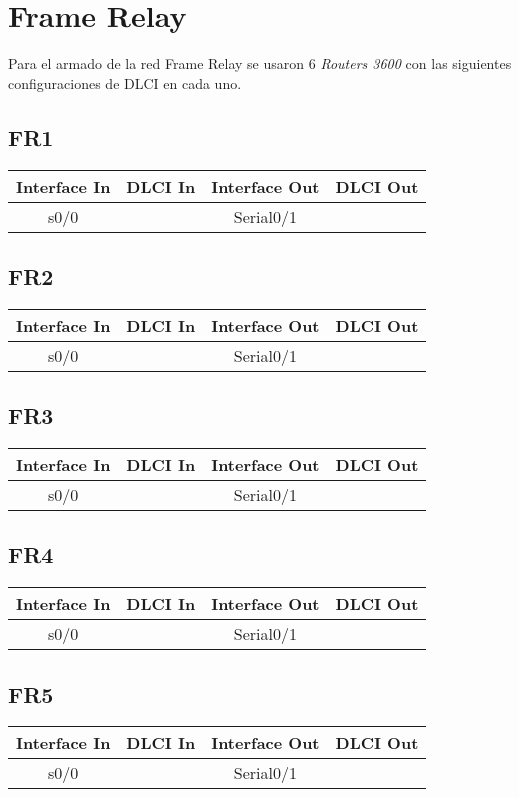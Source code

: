 \documentclass[12pt,a4paper,spanish]{article}
\begin{document}
\newpage
\section{Frame Relay}
Para el armado de la red Frame Relay se usaron 6 \emph{Routers 3600}
con las siguientes configuraciones de DLCI en cada uno.
\subsection{FR1}
\begin{tabular}{|c|c|c|c|}
\hline
Interface In & DLCI In & Interface Out & DLCI Out \\
\hline
\hline
 s0/0 &  & Serial0/1 &  \\
\hline
\end{tabular}

\subsection{FR2}
\begin{tabular}{|c|c|c|c|}
\hline
Interface In & DLCI In & Interface Out & DLCI Out \\
\hline
\hline
 s0/0 &  & Serial0/1 &  \\
\hline
\end{tabular}

\subsection{FR3}
\begin{tabular}{|c|c|c|c|}
\hline
Interface In & DLCI In & Interface Out & DLCI Out \\
\hline
\hline
 s0/0 &  & Serial0/1 &  \\
\hline
\end{tabular}

\subsection{FR4}
\begin{tabular}{|c|c|c|c|}
\hline
Interface In & DLCI In & Interface Out & DLCI Out \\
\hline
\hline
 s0/0 &  & Serial0/1 &  \\
\hline
\end{tabular}

\subsection{FR5}
\begin{tabular}{|c|c|c|c|}
\hline
Interface In & DLCI In & Interface Out & DLCI Out \\
\hline
\hline
 s0/0 &  & Serial0/1 &  \\
\hline
\end{tabular}
\end{document}
